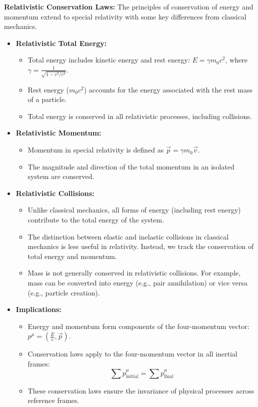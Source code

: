\documentclass{article}
\newcommand{\conceptbox}[1]{\begin{tcolorbox}[colback=blue!10] #1 \end{tcolorbox}}
\begin{document}
\conceptbox{
\textbf{Relativistic Conservation Laws:} 
The principles of conservation of energy and momentum extend to special relativity with some key differences from classical mechanics. 

\begin{itemize}
    \item \textbf{Relativistic Total Energy:} 
    \begin{itemize}
        \item Total energy includes kinetic energy and rest energy: \( E = \gamma m_0 c^2 \), where \( \gamma = \frac{1}{\sqrt{1 - v^2/c^2}} \).
        \item Rest energy (\( m_0 c^2 \)) accounts for the energy associated with the rest mass of a particle.
        \item Total energy is conserved in all relativistic processes, including collisions.
    \end{itemize}

    \item \textbf{Relativistic Momentum:} 
    \begin{itemize}
        \item Momentum in special relativity is defined as \( \vec{p} = \gamma m_0 \vec{v} \).
        \item The magnitude and direction of the total momentum in an isolated system are conserved.
    \end{itemize}

    \item \textbf{Relativistic Collisions:} 
    \begin{itemize}
        \item Unlike classical mechanics, all forms of energy (including rest energy) contribute to the total energy of the system.
        \item The distinction between elastic and inelastic collisions in classical mechanics is less useful in relativity. Instead, we track the conservation of total energy and momentum.
        \item Mass is not generally conserved in relativistic collisions. For example, mass can be converted into energy (e.g., pair annihilation) or vice versa (e.g., particle creation).
    \end{itemize}

    \item \textbf{Implications:} 
    \begin{itemize}
        \item Energy and momentum form components of the four-momentum vector: \( p^\mu = \left( \frac{E}{c}, \vec{p} \right) \).
        \item Conservation laws apply to the four-momentum vector in all inertial frames:
        \[
        \sum p^\mu_{\text{initial}} = \sum p^\mu_{\text{final}}
        \]
        \item These conservation laws ensure the invariance of physical processes across reference frames.
    \end{itemize}
\end{itemize}
}
\end{document}

